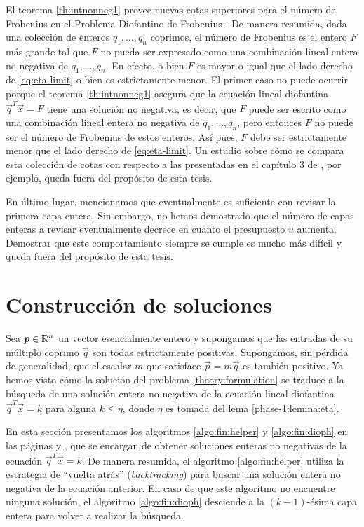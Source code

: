 El teorema \ref{th:intnonneg1} provee nuevas cotas superiores para el número de Frobenius en el
Problema Diofantino de Frobenius \cite{frob}. De manera resumida, dada una colección de enteros
$q_1, \ldots, q_n$ coprimos, el número de Frobenius es el entero $F$ más grande tal que $F$ no pueda
ser expresado como una combinación lineal entera no negativa de $q_1, \ldots, q_n$. En efecto, o
bien $F$ es mayor o igual que el lado derecho de \eqref{eq:eta-limit} o bien es estrictamente menor.
El primer caso no puede ocurrir porque el teorema \ref{th:intnonneg1} asegura que la ecuación lineal
diofantina $\vec{q}^T\vec{x} = F$ tiene una solución no negativa, es decir, que $F$ puede ser
escrito como una combinación lineal entera no negativa de $q_1, \ldots, q_n$, pero entonces $F$ no
puede ser el número de Frobenius de estos enteros. Así pues, $F$ debe ser estrictamente menor que el
lado derecho de \eqref{eq:eta-limit}. Un estudio sobre cómo se compara esta colección de cotas con
respecto a las presentadas en el capítulo 3 de \cite{frob}, por ejemplo, queda fuera del propósito
de esta tesis.

En último lugar, mencionamos que eventualmente es suficiente con revisar la primera capa entera. Sin
embargo, no hemos demostrado que el número de capas enteras a revisar eventualmente decrece en
cuanto el presupuesto $u$ aumenta. Demostrar que este comportamiento siempre se cumple es mucho más
difícil y queda fuera del propósito de esta tesis.

\section{Construcción de soluciones}
\label{subsec:complex}

\noindent
Sea $\boldsymbol{p} \in \mathbb{R}^n$ un vector esencialmente entero y supongamos que las entradas de su múltiplo
coprimo $\vec{q}$ son todas estrictamente positivas. Supongamos, sin pérdida de generalidad, que el
escalar $m$ que satisface $\vec{p} = m\vec{q}$ es también positivo. Ya hemos visto cómo la
solución del problema \eqref{theory:formulation} se traduce a la búsqueda de una solución entera no
negativa de la ecuación lineal diofantina $\vec{q}^T\vec{x} = k$ para alguna $k \leq \eta$, donde
$\eta$ es tomada del lema \ref{phase-1:lemma:eta}.

En esta sección presentamos los algoritmos \ref{algo:fin:helper} y \ref{algo:fin:dioph} en las
páginas \pageref{algo:fin:helper} y \pageref{algo:fin:dioph}, que se encargan de obtener soluciones
enteras no negativas de la ecuación $\vec{q}^T\vec{x} = k$. De manera resumida, el algoritmo
\ref{algo:fin:helper} utiliza la estrategia de ``vuelta atrás'' (\textit{backtracking}) para
buscar una solución entera no negativa de la ecuación anterior. En caso de que este algoritmo no
encuentre ninguna solución, el algoritmo \ref{algo:fin:dioph} desciende a la $(k - 1)$-ésima capa
entera para volver a realizar la búsqueda.

